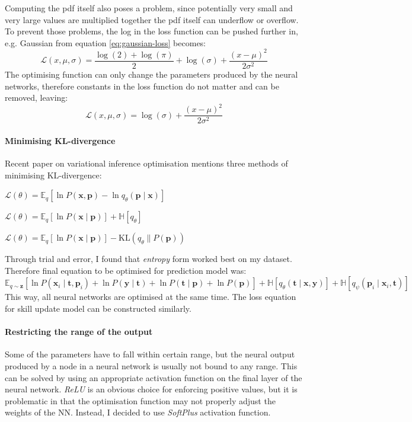 \documentclass[12pt,a4paper]{book}
\newcommand\bs[1]{\boldsymbol{#1}}
\begin{document}
Computing the pdf itself also poses a problem, since potentially very small and very large values are multiplied together the pdf itself can underflow or overflow.
To prevent those problems, the log in the loss function can be pushed further in, e.g. Gaussian from equation \ref{eq:gaussian-loss} becomes:
\begin{equation*}
\mathcal{L}(x,\mu,\sigma) = \frac{\log(2)+\log(\pi)}{2}+\log(\sigma)+\frac{(x-\mu)^2}{2\sigma^2}
\end{equation*}
The optimising function can only change the parameters produced by the neural networks, therefore constants in the loss function do not matter and can be removed, leaving:
\begin{equation}
\mathcal{L}(x,\mu,\sigma) = \log(\sigma)+\frac{(x-\mu)^2}{2\sigma^2}
\label{eq:gaussian-log-loss}
\end{equation}

\paragraph{Minimising KL-divergence}
Recent paper on variational inference optimisation \cite{variationalmethods} mentions three methods of minimising KL-divergence:
\begin{description}[labelwidth=\widthof{\bfseries Entropy form }]
\item[FMC form] $\mathcal{L}(\theta) = \mathbb{E}_{q}[\ln P(\bs{x},\bs{p}) - \ln q_\theta(\bs{p}\mid\bs{x})]$
\item[Entropy form] $\mathcal{L}(\theta) = \mathbb{E}_{q}[\ln P(\bs{x}\mid\bs{p})] + \mathbb{H}[q_\theta]$
\item[KL form] $\mathcal{L}(\theta) = \mathbb{E}_{q}[\ln P(\bs{x}\mid\bs{p})] - \text{KL}(q_\theta \parallel P(\bs{p}))$
\end{description}
Through trial and error, I found that \emph{entropy} form worked best on my dataset.
Therefore final equation to be optimised for prediction model was:
\begin{equation*}
\mathbb{E}_{q\sim\bs{z}}[\ln P(\bs{x}_i\mid\bs{t},\bs{p}_i)+\ln P(\bs{y}\mid\bs{t})+\ln P(\bs{t}\mid\bs{p})+\ln P(\bs{p})] + \mathbb{H}[q_\theta(\bs{t}\mid\bs{x},\bs{y})] + \mathbb{H}[q_\psi(\bs{p}_i\mid\bs{x}_i,\bs{t})]
\end{equation*}
This way, all neural networks are optimised at the same time.
The loss equation for skill update model can be constructed similarly.
\paragraph{Restricting the range of the output}
Some of the parameters have to fall within certain range, but the neural output produced by a node in a neural network is usually not bound to any range.
This can be solved by using an appropriate activation function on the final layer of the neural network.
\emph{ReLU} is an obvious choice for enforcing positive values, but it is problematic in that the optimisation function may not properly adjust the weights of the NN.
Instead, I decided to use \emph{SoftPlus} activation function.
\end{document}

